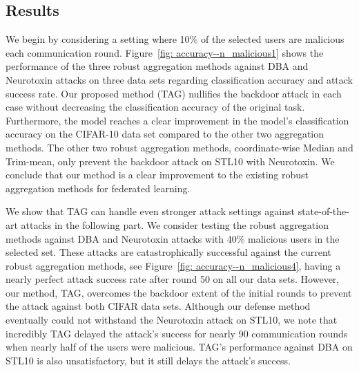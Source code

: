 \documentclass{article} %
\begin{document}
\subsection{Results}

We begin by considering a setting where 10\% of the selected users are malicious each communication round. Figure~\ref{fig: accuracy--n_malicious1} shows the performance of the three robust aggregation methods against DBA and Neurotoxin attacks on three data sets regarding classification accuracy and attack success rate. Our proposed method (TAG) nullifies the backdoor attack in each case without decreasing the classification accuracy of the original task. Furthermore, the model reaches a clear improvement in the model's classification accuracy on the CIFAR-10 data set compared to the other two aggregation methods.  The other two robust aggregation methods, coordinate-wise Median and Trim-mean, only prevent the backdoor attack on STL10 with Neurotoxin.  We conclude that our method is a clear improvement to the existing robust aggregation methods for federated learning. 

We show that TAG can handle even stronger attack settings against state-of-the-art attacks in the following part. We consider testing the robust aggregation methods against DBA and Neurotoxin attacks with 40\% malicious users in the selected set.  These attacks are catastrophically successful against the current robust aggregation methods, see Figure~\ref{fig: accuracy--n_malicious4}, having a nearly perfect attack success rate after round 50 on all our data sets. However, our method, TAG, overcomes the backdoor extent of the initial rounds to prevent the attack against both CIFAR data sets. Although our defense method eventually could not withstand the Neurotoxin attack on STL10, we note that incredibly TAG delayed the attack's success for nearly 90 communication rounds when nearly half of the users were malicious. TAG's performance against DBA on STL10 is also unsatisfactory, but it still delays the attack's success.
\end{document}
